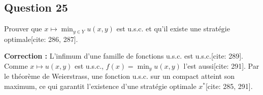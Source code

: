 \subsection*{Question 25}
Prouver que $x \mapsto \min_{y \in Y} u(x, y)$ est u.s.c. et qu'il existe une stratégie optimale[cite: 286, 287].

\textbf{Correction :}
L'infimum d'une famille de fonctions u.s.c. est u.s.c.[cite: 289]. Comme $x \mapsto u(x, y)$ est u.s.c., $f(x) = \min_y u(x, y)$ l'est aussi[cite: 291]. Par le théorème de Weierstrass, une fonction u.s.c. sur un compact atteint son maximum, ce qui garantit l'existence d'une stratégie optimale $x^*$[cite: 285, 291].


